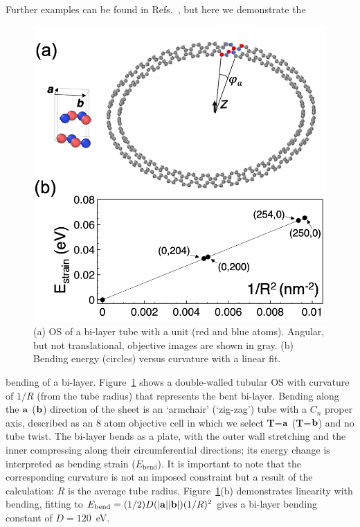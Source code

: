 \documentclass[reprint,onecolumn,superscriptaddress]{revtex4-1}
\begin{document}
Further examples can be found in Refs.~\cite{Nikiforov2014,
  XU2019, DUMITRICA2019}, but here we demonstrate the
\begin{figure}[htbp]
  \begin{center}
    \includegraphics[scale=0.4]{Fig2_td.png}
    \caption{\label{fig2_td} (a) OS of a  bi-layer tube with a 
      unit (red and blue atoms). Angular, but not translational, objective
      images are shown in gray. (b) Bending energy (circles)
      versus curvature with a linear fit.}
  \end{center}
\end{figure}
bending of a  bi-layer. Figure~\ref{fig2_td} shows a double-walled
tubular OS with curvature of $1/R$ (from the tube radius) that
represents the bent bi-layer. Bending along the ${\bf a}$ (${\bf b}$) direction of the
sheet is an `armchair' (`zig-zag') tube with a $C_n$ proper axis, described as
an 8 atom objective cell in which we select {\bf T}=${\bf a}$ ({\bf T}=${\bf
  b}$) and no tube twist.  The bi-layer bends as a plate, with the outer wall
stretching and the inner compressing along their circumferential directions; its
energy change is interpreted as bending strain ($E_\text{bend}$). It is important
to note that the corresponding curvature is not an imposed constraint but a
result of the calculation: $R$ is the average tube
radius. Figure~\ref{fig2_td}(b) demonstrates linearity with bending, fitting to
$E_\text{bend}=(1/2)D(|{\bf a}| |{\bf b}|)(1/R)^2$ gives a bi-layer bending
constant of $D=120$~eV.
\end{document}
